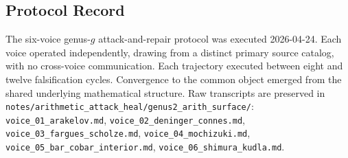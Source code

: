 \subsection{Protocol Record}
\label{v4-arith:app:B:genus-g:protocol}

The six-voice genus-$g$ attack-and-repair protocol was executed
2026-04-24. Each voice operated independently, drawing from a
distinct primary source catalog, with no cross-voice communication.
Each trajectory executed between eight and twelve falsification
cycles. Convergence to the common object emerged from the shared
underlying mathematical structure. Raw transcripts are preserved in
\texttt{notes/arithmetic\_attack\_heal/genus2\_arith\_surface/}:
\texttt{voice\_01\_arakelov.md},
\texttt{voice\_02\_deninger\_connes.md},
\texttt{voice\_03\_fargues\_scholze.md},
\texttt{voice\_04\_mochizuki.md},
\texttt{voice\_05\_bar\_cobar\_interior.md},
\texttt{voice\_06\_shimura\_kudla.md}.
